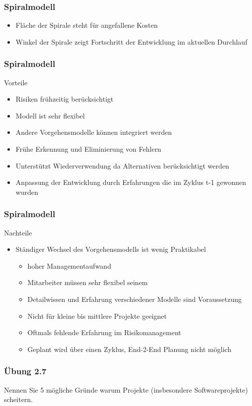 \begin{frame}
\frametitle{Spiralmodell}
	\begin{itemize}
		\item Fläche der Spirale steht für angefallene Kosten
		\item Winkel der Spirale zeigt Fortschritt der Entwicklung im aktuellen Durchlauf
	\end{itemize}
\end{frame}

\begin{frame}
\frametitle{Spiralmodell}
	Vorteile
	\begin{itemize}
		\item Risiken frühzeitig berücksichtigt
		\item Modell ist sehr flexibel
		\item Andere Vorgehensmodelle können integriert werden
		\item Frühe Erkennung und Eliminierung von Fehlern
		\item Unterstützt Wiederverwendung da Alternativen berücksichtigt werden
		\item Anpassung der Entwicklung durch Erfahrungen die im Zyklus t-1 gewonnen wurden
	\end{itemize}
\end{frame}

\begin{frame}
\frametitle{Spiralmodell}
	Nachteile
	\begin{itemize}
	\item Ständiger Wechsel des Vorgehensmodells ist wenig Praktikabel
			\begin{itemize}
				\item hoher Managementaufwand
				\item Mitarbeiter müssen sehr flexibel seinem
				\item Detailwissen und Erfahrung verschiedener Modelle sind Voraussetzung
				\item Nicht für kleine bis mittlere Projekte geeignet
				\item Oftmals fehlende Erfahrung im Risikomanagement
				\item Geplant wird über einen Zyklus, End-2-End Planung nicht möglich
			\end{itemize}
	\end{itemize}
\end{frame}

\begin{frame}
\frametitle{Übung 2.7}
	Nennen Sie 5 mögliche Gründe warum Projekte (insbesondere Softwareprojekte) scheitern.
\end{frame}

